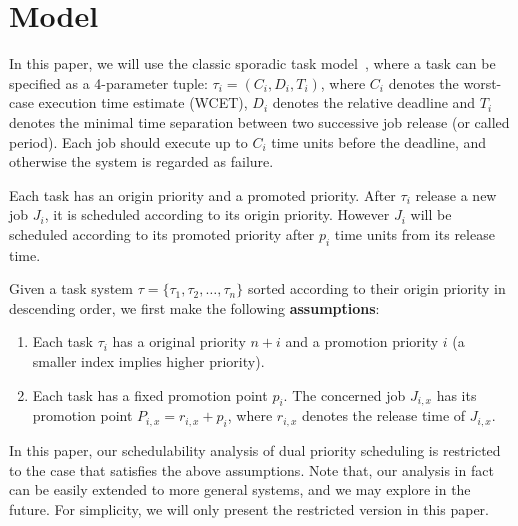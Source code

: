 \section{Model}
In this paper, we will use the classic sporadic task model~\cite{Mok1983}, where a task can be specified as a 4-parameter tuple: $\tau_i=(C_i,D_i,T_i)$, where $C_i$ denotes the worst-case execution time estimate (WCET), $D_i$ denotes the relative deadline and $T_i$ denotes the minimal time separation between two successive job release (or called period). Each job  should execute up to $C_i$ time units before the deadline, and otherwise the system is regarded as failure.

Each task has an origin priority and a promoted priority. After $\tau_i$ release a new job $J_{i}$, it is scheduled according to its origin priority. However $J_i$ will be scheduled according to its promoted priority after $p_i$ time units from its release time.

Given a task system $\tau=\{\tau_1,\tau_2,\ldots, \tau_n\}$ sorted according to their origin priority in descending order, we first make the following \textbf{assumptions}:
\begin{enumerate}
	\item Each task  $\tau_i$ has a original priority $n+i$ and a promotion priority $i$ (a smaller index implies higher priority).
	\item Each task has a fixed promotion point $p_i$. The concerned job $J_{i,x}$ has its promotion point $P_{i,x}=r_{i,x}+p_i$,  where $r_{i,x}$ denotes the release time of $J_{i,x}$.
\end{enumerate}



In this paper, our schedulability analysis of dual priority scheduling is restricted to the case that satisfies the above assumptions. Note that, our analysis in fact can be easily extended to more general systems, and we may explore in the future.  For simplicity, we will only present the restricted version in this paper.





